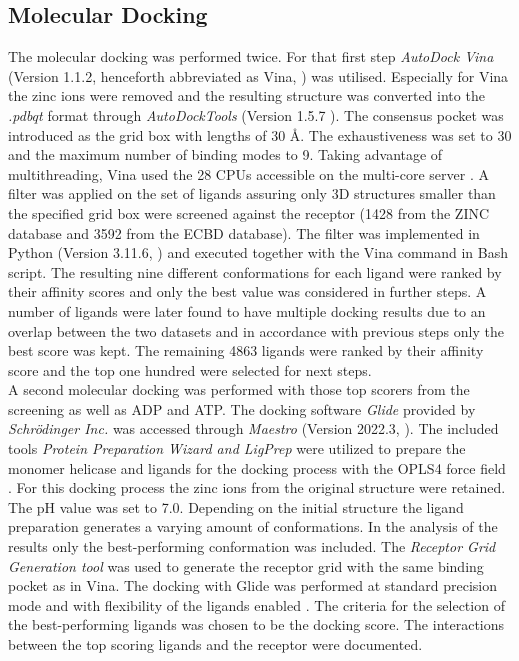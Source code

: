 \documentclass[11pt, letterpaper, titlepage]{article}
\renewcommand{\cite}{\parencite}
\begin{document}
\subsection{Molecular Docking}
The molecular docking was performed twice. 
For that first step \textit{AutoDock Vina} (Version 1.1.2, henceforth abbreviated as Vina, \textcite{Trott.2010}) was utilised. 
Especially for Vina the zinc ions were removed and the resulting structure was converted into the \textit{.pdbqt} format through \textit{AutoDockTools} (Version 1.5.7 \cite{Goodsell2021}). The consensus pocket was introduced as the grid box with lengths of 30 \AA. The exhaustiveness was set to 30 and the maximum number of binding modes to 9. Taking advantage of multithreading, \ac{Vina} used the 28 CPUs accessible on the multi-core server \cite{Che2023}. A filter was applied on the set of ligands assuring only 3D structures smaller than the specified grid box were screened against the receptor (1428 from the ZINC database and 3592 from the ECBD database). The filter was implemented in Python (Version 3.11.6, \textcite{Python}) and executed together with the Vina command in Bash script. The resulting nine different conformations for each ligand were ranked by their affinity scores and only the best value was considered in further steps. A number of ligands were later found to have multiple docking results due to an overlap between the two datasets and in accordance with previous steps only the best score was kept. The remaining 4863 ligands were ranked by their affinity score and the top one hundred were selected for next steps. \\
A second molecular docking was performed with those top scorers from the screening as well as \ac{ADP} and \ac{ATP}. The docking software \textit{Glide} provided by \textit{Schrödinger Inc.} \cite{Friesner2004} was accessed through \textit{Maestro} (Version 2022.3, \textcite{Maestro2022}). The included tools \textit{Protein Preparation Wizard {and} LigPrep} \cite{Madhavi2013} were utilized to prepare the monomer helicase and ligands for the docking process with the OPLS4 force field \cite{Lu2021}. For this docking process the zinc ions from the original structure were retained. The pH value was set to 7.0. Depending on the initial structure the ligand preparation generates a varying amount of conformations. In the analysis of the results only the best-performing conformation was included. The \textit{Receptor Grid Generation tool} was used to generate the receptor grid with the same binding pocket as in Vina. The docking with Glide was performed at standard precision mode and with flexibility of the ligands enabled \cite{Halgren.2004}. The criteria for the selection of the best-performing ligands was chosen to be the docking score. The interactions between the top scoring ligands and the receptor were documented. 
\end{document}
